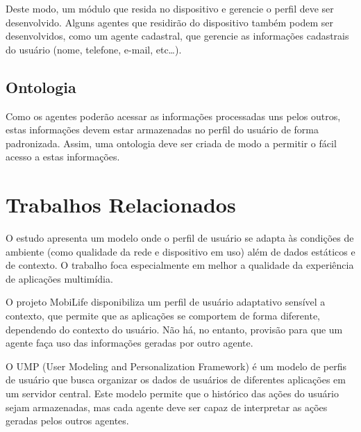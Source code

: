 \documentclass[a4paper, twocolumn]{article}
\begin{document}
Deste modo, um módulo que resida no dispositivo e gerencie o perfil deve ser desenvolvido. Alguns agentes que residirão do dispositivo também podem ser desenvolvidos, como um agente cadastral, que gerencie as informações cadastrais do usuário (nome, telefone, e-mail, etc\ldots).


\subsection{Ontologia} \label{sec:ontologia}

Como os agentes poderão acessar as informações processadas uns pelos outros, estas informações devem estar armazenadas no perfil do usuário de forma padronizada. Assim, uma ontologia deve ser criada de modo a permitir o fácil acesso a estas informações.


\section{Trabalhos Relacionados} \label{sec:relacionados}


O estudo \cite{chellouche10} apresenta um modelo onde o perfil de usuário se adapta às condições de ambiente (como qualidade da rede e dispositivo em uso) além de dados estáticos e de contexto. O trabalho foca especialmente em melhor a qualidade da experiência de aplicações multimídia.


O projeto MobiLife \cite{sutterer07} disponibiliza um perfil de usuário adaptativo sensível a contexto, que permite que as aplicações se comportem de forma diferente, dependendo do contexto do usuário. Não há, no entanto, provisão para que um agente faça uso das informações geradas por outro agente.


O UMP (User Modeling and Personalization Framework) \cite{korth07} é um modelo de perfis de usuário que busca organizar os dados de usuários de diferentes aplicações em um servidor central. Este modelo permite que o histórico das ações do usuário sejam armazenadas, mas cada agente deve ser capaz de interpretar as ações geradas pelos outros agentes.
\end{document}
